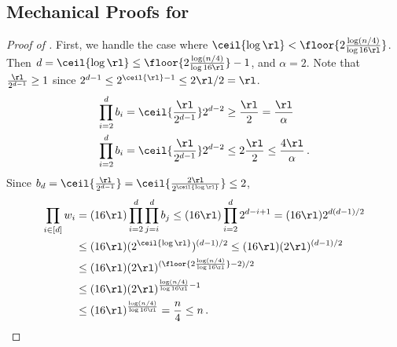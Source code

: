 \subsection{Mechanical Proofs for \texorpdfstring{}{Random Tape Upper Bound}}\label{subsec:rt-ub-mech}

\begin{proof}[Proof of ]
  First, we handle the case where $\ceil{\log \rl} <  \floor{2 \frac{\log(n/4)}{\log 16 \rl}}$. Then $d = \ceil{\log \rl} \le \floor{2 \frac{\log(n/4)}{\log 16 \rl}} - 1$, and $\alpha = 2$. Note that $\frac{\rl}{2^{d - 1}} \ge 1$ since $2^{d - 1} \le  2^{\ceil{\rl} - 1} \le 2\rl/2 = \rl$.
  \begin{align*}
      \prod_{i=2}^{d} b_i &= \ceil{\frac{\rl}{2^{d - 1}}} 2^{d - 2} \ge \frac{\rl}{2} = \frac{\rl}{\alpha} \\
      \prod_{i=2}^{d} b_i &=  \ceil{\frac{\rl}{2^{d - 1}}} 2^{d - 2} \le 2 \frac{\rl}{2} \le \frac{4 \rl}{\alpha} \,.
  \end{align*}
  Since $b_d = \ceil{\frac{\rl}{2^{d - 1}}} = \ceil{\frac{2 \rl}{2^{\ceil{\log \rl}}}} \le 2$,
  \begin{align*}
    \prod_{i \in [d]} w_i &= (16 \rl) \prod_{i = 2}^{d} \prod_{j=i}^{d} b_j
      \le (16 \rl) \prod_{i = 2}^{d} 2^{d - i + 1} = (16 \rl) 2^{d (d-1) / 2} \\
      &\le (16 \rl) (2^{\ceil{\log \rl}})^{(d-1) / 2} \le (16 \rl) (2 \rl)^{(d-1) / 2} \\
      &\le (16 \rl) (2 \rl)^{(\floor{2 \frac{\log (n/4)}{\log 16\rl}}-2) / 2} \\
      &\le (16 \rl) (2 \rl)^{\frac{\log (n/4)}{\log 16\rl} - 1} \\
      &\le (16 \rl)^{\frac{\log (n/4)}{\log 16\rl}} = \frac{n}{4} \le n \,.
  \end{align*}


\end{proof}
